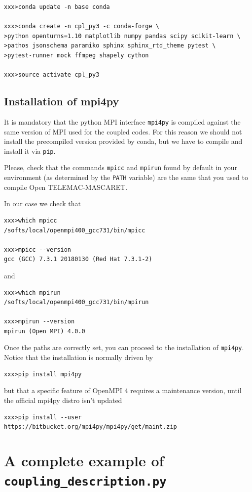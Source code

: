 \documentclass[Coupling]{../../data/TelemacDoc} %
\begin{document}
\begin{appendices}
\begin{verbatim}
xxx>conda update -n base conda

xxx>conda create -n cpl_py3 -c conda-forge \
>python openturns=1.10 matplotlib numpy pandas scipy scikit-learn \
>pathos jsonschema paramiko sphinx sphinx_rtd_theme pytest \
>pytest-runner mock ffmpeg shapely cython

xxx>source activate cpl_py3
\end{verbatim}


\section{Installation of mpi4py}\label{ann:mpi4py}
It is mandatory that the python MPI interface \texttt{mpi4py} is
compiled against the same version of MPI used for the coupled
codes. For this reason we should not install the precompiled version
provided by conda, but we have to compile and install it via
\texttt{pip}.
\newline

Please, check that the commands \texttt{mpicc} and \texttt{mpirun}
found by default in your environment (as determined by the
\texttt{PATH} variable) are the same that you used to compile Open
TELEMAC-MASCARET.

In our case we check that
\begin{verbatim}
xxx>which mpicc
/softs/local/openmpi400_gcc731/bin/mpicc

xxx>mpicc --version
gcc (GCC) 7.3.1 20180130 (Red Hat 7.3.1-2)
\end{verbatim}
and
\begin{verbatim}
xxx>which mpirun
/softs/local/openmpi400_gcc731/bin/mpirun

xxx>mpirun --version
mpirun (Open MPI) 4.0.0
\end{verbatim}

Once the paths are correctly set, you can proceed to the installation of
\texttt{mpi4py}.
Notice that the installation is normally driven by
\begin{verbatim}
xxx>pip install mpi4py
\end{verbatim}
but that a specific feature of OpenMPI 4 requires a maintenance
version, until the official mpi4py distro isn't updated
\begin{verbatim}
xxx>pip install --user https://bitbucket.org/mpi4py/mpi4py/get/maint.zip
\end{verbatim}

\chapter{A complete example of
  \texttt{coupling\_description.py}}\label{app:coupling_description}


\end{appendices}
\end{document}
